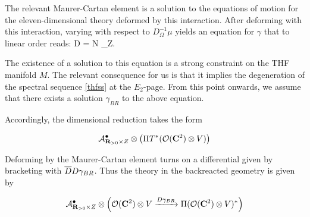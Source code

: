The relevant Maurer-Cartan element is a solution to the equations of motion for the eleven-dimensional theory deformed by this interaction. After deforming with this interaction, varying with respect to $D_{\Omega}^{-1}\mu$ yields an equation for $\gamma$ that to linear order reads:
\beqn
\thfd D \gamma  = N \delta_Z.
\eeqn

The existence of a solution to this equation is a strong constraint on the THF manifold $M$. The relevant consequence for us is that it implies the degeneration of the spectral sequence \ref{thfss} at the $E_{2}$-page. From this point onwards, we assume that there exists a solution $\gamma_{BR}$ to the above equation.

Accordingly, the dimensional reduction takes the form

\[
\mathcal A^{\bullet}_{\mathbf{R}_{>0}\times Z} \otimes \left ( \Pi T^{*} (\mathcal O (\mathbf{C}^{2}) \otimes V) \right)
\]

Deforming by the Maurer-Cartan element turns on a differential given by bracketing with $\overline{D} D\gamma_{BR}$. Thus the theory in the backreacted geometry is given by

\[
\mathcal A^{\bullet}_{\mathbf{R}_{>0}\times Z} \otimes \left ( \mathcal O (\mathbf{C}^{2})\otimes V \xrightarrow{D\gamma_{BR}} \Pi (\mathcal O (\mathbf{C}^{2})\otimes V)^{*} \right )
\]





